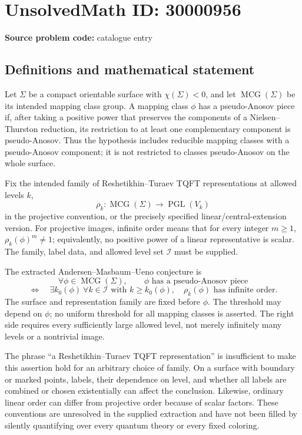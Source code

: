 \documentclass[11pt]{article}
\begin{document}
\section*{UnsolvedMath ID: 30000956}
\textbf{Source problem code:} catalogue entry
\subsection{Definitions and mathematical statement}
Let \(\Sigma\) be a compact orientable surface with \(\chi(\Sigma)<0\), and let \(\operatorname{MCG}(\Sigma)\) be its intended mapping class group. A mapping class \(\phi\) has a pseudo-Anosov piece if, after taking a positive power that preserves the components of a Nielsen--Thurston reduction, its restriction to at least one complementary component is pseudo-Anosov. Thus the hypothesis includes reducible mapping classes with a pseudo-Anosov component; it is not restricted to classes pseudo-Anosov on the whole surface.

Fix the intended family of Reshetikhin--Turaev TQFT representations at allowed levels \(k\),
\[
 \rho_k:\operatorname{MCG}(\Sigma)\longrightarrow\operatorname{PGL}(V_k)
\]
in the projective convention, or the precisely specified linear/central-extension version. For projective images, infinite order means that for every integer \(m\geq1\), \(\rho_k(\phi)^m\ne1\); equivalently, no positive power of a linear representative is scalar. The family, label data, and allowed level set \(\mathcal I\) must be supplied.

The extracted Andersen--Masbaum--Ueno conjecture is
\[
 \forall\phi\in\operatorname{MCG}(\Sigma),\qquad
 \phi\text{ has a pseudo-Anosov piece}
\]
\[
 \Longleftrightarrow\quad
 \exists k_0(\phi)\ \forall k\in\mathcal I\text{ with }k\geq k_0(\phi),
 \quad\rho_k(\phi)\text{ has infinite order}.
\]
The surface and representation family are fixed before \(\phi\). The threshold may depend on \(\phi\); no uniform threshold for all mapping classes is asserted. The right side requires every sufficiently large allowed level, not merely infinitely many levels or a nontrivial image.

The phrase ``a Reshetikhin--Turaev TQFT representation'' is insufficient to make this assertion hold for an arbitrary choice of family. On a surface with boundary or marked points, labels, their dependence on level, and whether all labels are combined or chosen existentially can affect the conclusion. Likewise, ordinary linear order can differ from projective order because of scalar factors. These conventions are unresolved in the supplied extraction and have not been filled by silently quantifying over every quantum theory or every fixed coloring.
\end{document}
